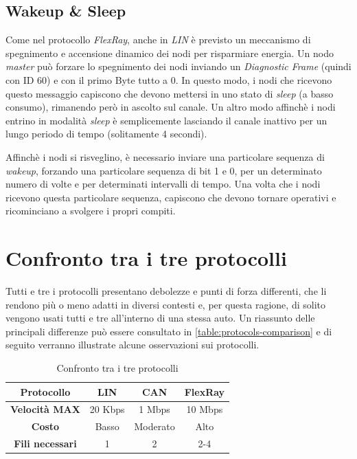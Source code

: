 \subsection{Wakeup \& Sleep}
Come nel protocollo \emph{FlexRay}, anche in \emph{LIN} è previsto un meccanismo di spegnimento e accensione dinamico dei nodi per risparmiare energia. Un nodo \emph{master} può forzare lo spegnimento dei nodi inviando un \emph{Diagnostic Frame} (quindi con ID 60) e con il primo Byte tutto a 0. In questo modo, i nodi che ricevono questo messaggio capiscono che devono mettersi in uno stato di \emph{sleep} (a basso consumo), rimanendo però in ascolto sul canale. Un altro modo affinchè i nodi entrino in modalità \emph{sleep} è semplicemente lasciando il canale inattivo per un lungo periodo di tempo (solitamente 4 secondi).

Affinchè i nodi si risveglino, è necessario inviare una particolare sequenza di \emph{wakeup}, forzando una particolare sequenza di bit 1 e 0, per un determinato numero di volte e per determinati intervalli di tempo. Una volta che i nodi ricevono questa particolare sequenza, capiscono che devono tornare operativi e ricominciano a svolgere i propri compiti.

\section{Confronto tra i tre protocolli}
Tutti e tre i protocolli presentano debolezze e punti di forza differenti, che li rendono più o meno adatti in diversi contesti e, per questa ragione, di solito vengono usati tutti e tre all'interno di una stessa auto. Un riassunto delle principali differenze può essere consultato in \autoref{table:protocols-comparison} e di seguito verranno illustrate alcune osservazioni sui protocolli.
\begin{table}[h]
    \centering
    \begin{tabular}{| c || c | c | c |}
        \hline
        \large{\textbf{Protocollo}} & \large{\textbf{LIN}} & \large{\textbf{CAN}} & \large{\textbf{FlexRay}} \\
        \hline
        \large{\textbf{Velocità MAX}} & 20 Kbps & 1 Mbps & 10 Mbps \\
        \hline
        \large{\textbf{Costo}} & Basso & Moderato & Alto \\
        \hline
        \large{\textbf{Fili necessari}} & 1 & 2 & 2-4 \\
        \hline
    \end{tabular}
    \caption{Confronto tra i tre protocolli}
    \label{table:protocols-comparison}
\end{table}

